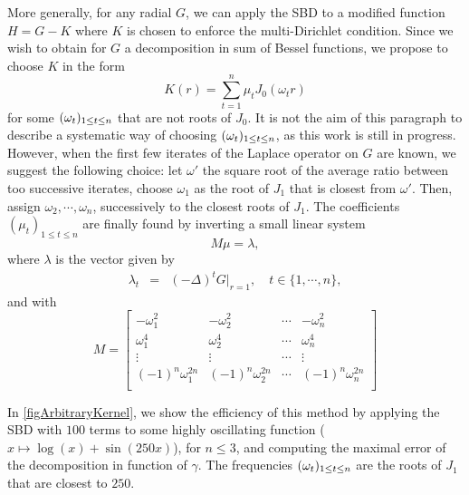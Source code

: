 \documentclass{article}
\begin{document}
More generally, for any radial $G$, we can apply the SBD to a modified function $H = G - K$ where $K$ is chosen to enforce the multi-Dirichlet condition. Since we wish to obtain for $G$ a decomposition in sum of Bessel functions, we propose to choose $K$ in the form 
\[K(r) = \sum_{t=1}^{n} \mu_t J_0(\omega_t r)\]
for some $(\omega_{t})_{1 \leq t \leq n}$ that are not roots of $J_0$. It is not the aim of this paragraph to describe a systematic way of choosing $(\omega_{t})_{1 \leq t \leq n}$, as this work is still in progress. However, when the first few iterates of the Laplace operator on $G$ are known, we suggest the following choice: let $\omega'$ the square root of the average ratio between too successive iterates, choose $\omega_1$ as the root of $J_1$ that is closest from $\omega'$. Then, assign $\omega_2, \cdots, \omega_n$, successively to the closest roots of $J_1$. The coefficients $(\mu_t)_{1 \leq t \leq n}$ are finally found by inverting a small linear system 
\[M\mu = \lambda,\]
where $\lambda$ is the vector given by
\begin{eqnarray*}
	\lambda_t &=& (-\Delta)^t G \big|_{r=1}, \quad t\in \{1,\cdots,n\},
\end{eqnarray*}
and with
\[M=
	\begin{bmatrix}
		-\omega_1^2      & -\omega_2^2             & \cdots & -\omega_n^2  \\
			\omega_1^4   & \omega_2^4 		              & \cdots & \omega_n^4   \\
		\vdots      	& \vdots                              & \cdots & \vdots     \\
		(-1)^n \omega_1^{2n}      & (-1)^n \omega_2^{2n}  & \cdots &(-1)^n \omega_n^{2n} \\ 
	\end{bmatrix}
\]
\vspace{5pt}

In \autoref{figArbitraryKernel}, we show the efficiency of this method by applying the SBD with $100$ terms to some highly oscillating function ($x \mapsto \log(x) + \sin(250x)$), 
for $n \leq 3$, and computing the maximal error of the decomposition in function of $\gamma$. The frequencies $(\omega_{t})_{1 \leq t \leq n}$ are the roots of $J_1$ that are closest to $250$. 
										
\end{document}
